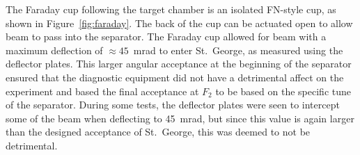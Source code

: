The Faraday cup following the target chamber is an isolated FN-style
cup, as shown in Figure~\ref{fig:faraday}. The back of the cup can be
actuated open to allow beam to pass into the separator. The Faraday cup
allowed for beam with a maximum deflection of $\approx 45$~mrad to enter
St.\ George, as measured using the deflector plates. This larger angular
acceptance at the beginning of the separator ensured that the diagnostic
equipment did not have a detrimental affect on the experiment and based
the final acceptance at $F_2$ to be based on the specific tune of the
separator. During some tests, the deflector plates were seen to
intercept some of the beam when deflecting to 45~mrad, but since this
value is again larger than the designed acceptance of St.\ George, this
was deemed to not be detrimental.
